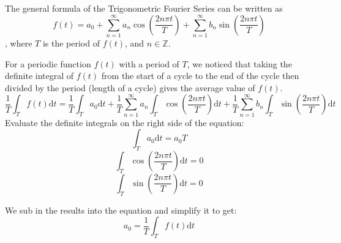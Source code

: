 \documentclass[12pt]{article}
\begin{document}
\indent The general formula of the Trigonometric Fourier Series can be written as
\begin{equation}
    f(t) = a_0 + \sum_{n=1}^{\infty}a_n\cos(\frac{2n\pi t}{T}) + \sum_{n=1}^{\infty}b_n\sin(\frac{2n\pi t}{T})
    \label{equ:trig_fourier_series_expansion}
\end{equation}
, where $T$ is the period of $f(t)$, and $n\in\mathbb{Z}$.

\indent For a periodic function $f(t)$ with a period of $T$, 
we noticed that taking the definite integral of $f(t)$ from the start of a cycle to the end of the cycle
then divided by the period (length of a cycle) gives the average value of $f(t)$. 
$$  
    \frac{1}{T}     \int_{T}f(t)\mathrm{d}t
    = \frac{1}{T}   \int_{T}a_0\mathrm{d}t
    + \frac{1}{T}   \sum_{n=1}^{\infty}   a_n   \int_{T}\cos(\frac{2n\pi t}{T})\mathrm{d}t
    + \frac{1}{T}   \sum_{n=1}^{\infty}   b_n \int_{T}\sin(\frac{2n\pi t}{T})\mathrm{d}t
$$
Evaluate the definite integrals on the right side of the equation:
$$      \int_{T} a_0 \mathrm{d}t    =   a_0  T                  $$
$$      \int_{T}\cos(\frac{2n\pi t}{T})\mathrm{d}t  = 0         $$
$$      \int_{T}\sin(\frac{2n\pi t}{T})\mathrm{d}t  = 0         $$

We sub in the results into the equation and simplify it to get:
\begin{equation}
    a_0  =  \frac{1}{T} \int_{T} f(t) \mathrm{d}t
    \label{equ:fourier_series_a0_term}
\end{equation}
\end{document}

